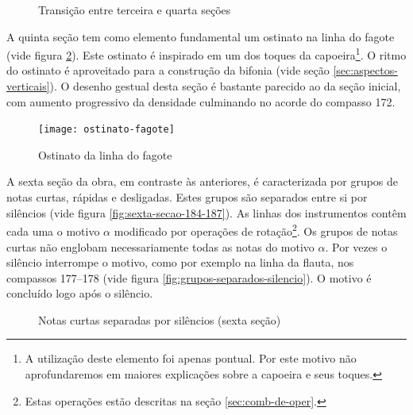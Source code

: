 \begin{figure}
  \centering
  \caption{Transição entre terceira e quarta seções}
  \label{fig:transicao-3-4}
\end{figure}

A quinta seção tem como elemento fundamental um ostinato na linha do
fagote (vide figura \ref{fig:ostinato-fagote}). Este ostinato é
inspirado em um dos toques da capoeira\footnote{A utilização deste
  elemento foi apenas pontual. Por este motivo não aprofundaremos em
  maiores explicações sobre a capoeira e seus toques.}. O ritmo do
ostinato é aproveitado para a construção da bifonia (vide seção
\ref{sec:aspectos-verticais}). O desenho gestual desta seção é
bastante parecido ao da seção inicial, com aumento progressivo da
densidade culminando no acorde do compasso 172.

\begin{figure}
  \centering
  \texttt{[image: ostinato-fagote]}
  \caption{Ostinato da linha do fagote}
  \label{fig:ostinato-fagote}
\end{figure}

A sexta seção da obra, em contraste às anteriores, é caracterizada por
grupos de notas curtas, rápidas e desligadas. Estes grupos são
separados entre si por silêncios (vide figura
\ref{fig:sexta-secao-184-187}). As linhas dos instrumentos contêm cada
uma o motivo $\alpha$ modificado por operações de
rotação\footnote{Estas operações estão descritas na seção
  \ref{sec:comb-de-oper}.}. Os grupos de notas curtas não englobam
necessariamente todas as notas do motivo $\alpha$. Por vezes o
silêncio interrompe o motivo, como por exemplo na linha da flauta, nos
compassos 177--178 (vide figura
\ref{fig:grupos-separados-silencio}). O motivo é concluído logo após o
silêncio.

\begin{figure}
  \centering


  \caption{Notas curtas separadas por silêncios (sexta seção)}
  \label{fig:sexta-secao-notas-curtas}
\end{figure}

